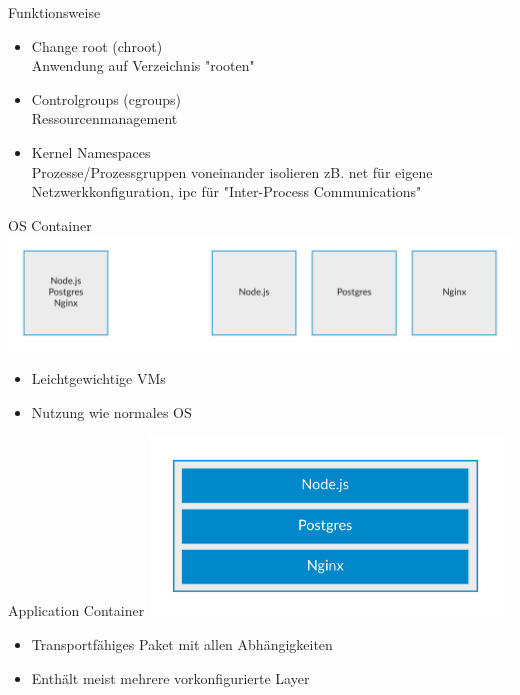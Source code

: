 \documentclass[10pt]{beamer}
\begin{document}
\begin{frame}{Funktionsweise}
  \begin{itemize}
    \item Change root (chroot)\\
          Anwendung auf Verzeichnis "rooten"
    \item Controlgroups (cgroups)\\
          Ressourcenmanagement
    \item Kernel Namespaces\\
          Prozesse/Prozessgruppen voneinander isolieren zB. net f\"ur eigene Netzwerkkonfiguration, ipc f\"ur "Inter-Process Communications"
  \end{itemize}
\end{frame}

\begin{frame}{OS Container}
  \includegraphics[width=1\textwidth]{../images/4-os-specialized-containers.png}
  \begin{itemize}
    \item Leichtgewichtige VMs
    \item Nutzung wie normales OS
  \end{itemize}
\end{frame}

\begin{frame}{Application Container}
  \center
  \includegraphics[width=0.7\textwidth]{../images/5-application-container.png}
  \begin{itemize}
    \item Transportf\"ahiges Paket mit allen Abh\"angigkeiten
    \item Enth\"alt meist mehrere vorkonfigurierte Layer
  \end{itemize}
\end{frame}
\end{document}

